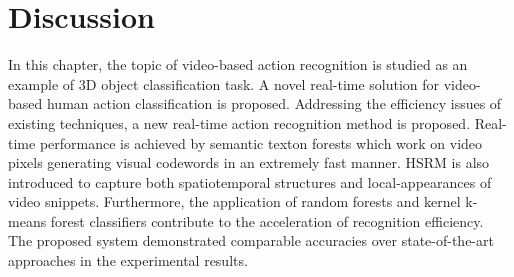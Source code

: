 \section{Discussion}
\label{sec/act/discussion}
In this chapter, the topic of video-based action recognition is studied as an example of 3D object classification task. A novel real-time solution for video-based human action classification is proposed. 
Addressing the efficiency issues of existing techniques, a new real-time action recognition method is proposed. 
Real-time performance is achieved by semantic texton forests which work on video pixels generating visual codewords in an extremely fast manner. HSRM is also introduced to capture both spatiotemporal structures and local-appearances of video snippets. 
Furthermore, the application of random forests and kernel k-means forest classifiers contribute to the acceleration of recognition efficiency. 
The proposed system demonstrated comparable accuracies over state-of-the-art approaches in the experimental results. 
